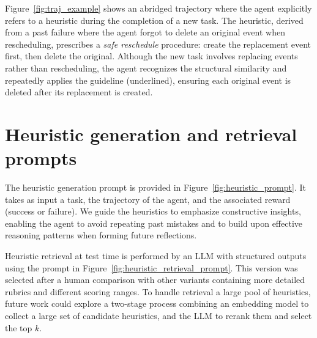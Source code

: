 \documentclass{article}
\begin{document}
Figure~\ref{fig:traj_example} shows an abridged trajectory where the agent explicitly refers to a heuristic during the completion of a new task. The heuristic, derived from a past failure where the agent forgot to delete an original event when rescheduling, prescribes a \textit{safe reschedule} procedure: create the replacement event first, then delete the original. Although the new task involves replacing events rather than rescheduling, the agent recognizes the structural similarity and repeatedly applies the guideline (underlined), ensuring each original event is deleted after its replacement is created.

\section{Heuristic generation and retrieval prompts}
\label{app:prompts}

The heuristic generation prompt is provided in Figure~\ref{fig:heuristic_prompt}. It takes as input a task, the trajectory of the agent, and the associated reward (success or failure). We guide the heuristics to emphasize constructive insights, enabling the agent to avoid repeating past mistakes and to build upon effective reasoning patterns when forming future reflections.

Heuristic retrieval at test time is performed by an LLM with structured outputs using the prompt in Figure~\ref{fig:heuristic_retrieval_prompt}. This version was selected after a human comparison with other variants containing more detailed rubrics and different scoring ranges. To handle retrieval a large pool of heuristics, future work could explore a two-stage process combining an embedding model to collect a large set of candidate heuristics, and the LLM to rerank them and select the top $k$.
\end{document}
